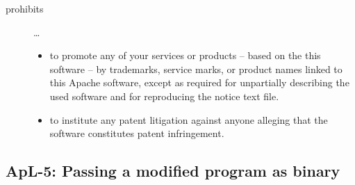 \begin{description}
\item[prohibits] \ldots
\begin{itemize}
  \item to promote any of your services or products – based on the this software
  – by trademarks, service marks, or product names linked to this Apache
  software, except as required for unpartially describing the used software and
  for reproducing the notice text file.
  \item to institute any patent litigation against anyone alleging that the
  software constitutes patent infringement.
\end{itemize}

\end{description}

\subsection{ApL-5: Passing a modified program as binary}

